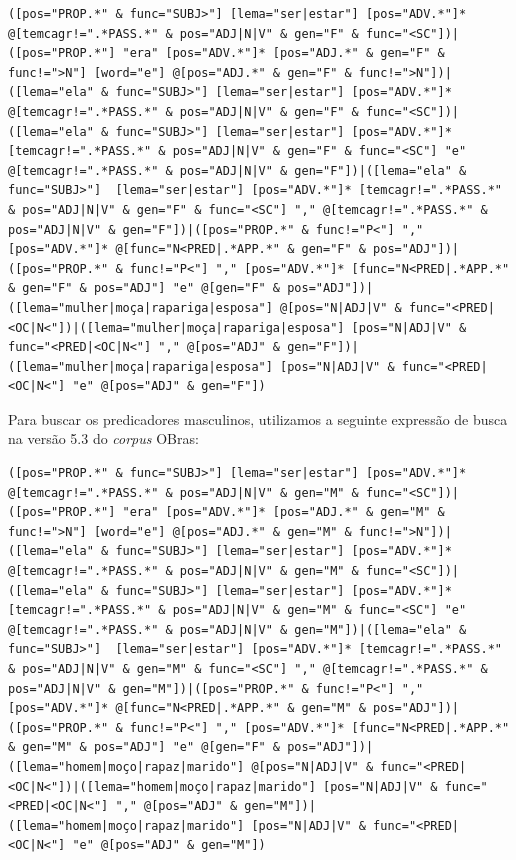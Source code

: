 \documentclass[portuguese]{textolivre}
\begin{document}
\begin{lstlisting}[basicstyle=\small\ttfamily,columns=flexible,breaklines=true]
([pos="PROP.*" & func="SUBJ>"] [lema="ser|estar"] [pos="ADV.*"]* @[temcagr!=".*PASS.*" & pos="ADJ|N|V" & gen="F" & func="<SC"])|([pos="PROP.*"] "era" [pos="ADV.*"]* [pos="ADJ.*" & gen="F" & func!=">N"] [word="e"] @[pos="ADJ.*" & gen="F" & func!=">N"])|([lema="ela" & func="SUBJ>"] [lema="ser|estar"] [pos="ADV.*"]* @[temcagr!=".*PASS.*" & pos="ADJ|N|V" & gen="F" & func="<SC"])|([lema="ela" & func="SUBJ>"] [lema="ser|estar"] [pos="ADV.*"]* [temcagr!=".*PASS.*" & pos="ADJ|N|V" & gen="F" & func="<SC"] "e" @[temcagr!=".*PASS.*" & pos="ADJ|N|V" & gen="F"])|([lema="ela" & func="SUBJ>"]  [lema="ser|estar"] [pos="ADV.*"]* [temcagr!=".*PASS.*" & pos="ADJ|N|V" & gen="F" & func="<SC"] "," @[temcagr!=".*PASS.*" & pos="ADJ|N|V" & gen="F"])|([pos="PROP.*" & func!="P<"] "," [pos="ADV.*"]* @[func="N<PRED|.*APP.*" & gen="F" & pos="ADJ"])|([pos="PROP.*" & func!="P<"] "," [pos="ADV.*"]* [func="N<PRED|.*APP.*" & gen="F" & pos="ADJ"] "e" @[gen="F" & pos="ADJ"])|([lema="mulher|moça|rapariga|esposa"] @[pos="N|ADJ|V" & func="<PRED|<OC|N<"])|([lema="mulher|moça|rapariga|esposa"] [pos="N|ADJ|V" & func="<PRED|<OC|N<"] "," @[pos="ADJ" & gen="F"])|([lema="mulher|moça|rapariga|esposa"] [pos="N|ADJ|V" & func="<PRED|<OC|N<"] "e" @[pos="ADJ" & gen="F"])
\end{lstlisting}

Para buscar os predicadores masculinos, utilizamos a seguinte expressão de busca na versão 5.3 do \textit{corpus} OBras:

\begin{lstlisting}[basicstyle=\small\ttfamily,columns=flexible,breaklines=true]
([pos="PROP.*" & func="SUBJ>"] [lema="ser|estar"] [pos="ADV.*"]* @[temcagr!=".*PASS.*" & pos="ADJ|N|V" & gen="M" & func="<SC"])|([pos="PROP.*"] "era" [pos="ADV.*"]* [pos="ADJ.*" & gen="M" & func!=">N"] [word="e"] @[pos="ADJ.*" & gen="M" & func!=">N"])|([lema="ela" & func="SUBJ>"] [lema="ser|estar"] [pos="ADV.*"]* @[temcagr!=".*PASS.*" & pos="ADJ|N|V" & gen="M" & func="<SC"])|([lema="ela" & func="SUBJ>"] [lema="ser|estar"] [pos="ADV.*"]* [temcagr!=".*PASS.*" & pos="ADJ|N|V" & gen="M" & func="<SC"] "e" @[temcagr!=".*PASS.*" & pos="ADJ|N|V" & gen="M"])|([lema="ela" & func="SUBJ>"]  [lema="ser|estar"] [pos="ADV.*"]* [temcagr!=".*PASS.*" & pos="ADJ|N|V" & gen="M" & func="<SC"] "," @[temcagr!=".*PASS.*" & pos="ADJ|N|V" & gen="M"])|([pos="PROP.*" & func!="P<"] "," [pos="ADV.*"]* @[func="N<PRED|.*APP.*" & gen="M" & pos="ADJ"])|([pos="PROP.*" & func!="P<"] "," [pos="ADV.*"]* [func="N<PRED|.*APP.*" & gen="M" & pos="ADJ"] "e" @[gen="F" & pos="ADJ"])|([lema="homem|moço|rapaz|marido"] @[pos="N|ADJ|V" & func="<PRED|<OC|N<"])|([lema="homem|moço|rapaz|marido"] [pos="N|ADJ|V" & func="<PRED|<OC|N<"] "," @[pos="ADJ" & gen="M"])|([lema="homem|moço|rapaz|marido"] [pos="N|ADJ|V" & func="<PRED|<OC|N<"] "e" @[pos="ADJ" & gen="M"])
\end{lstlisting}
\end{document}
